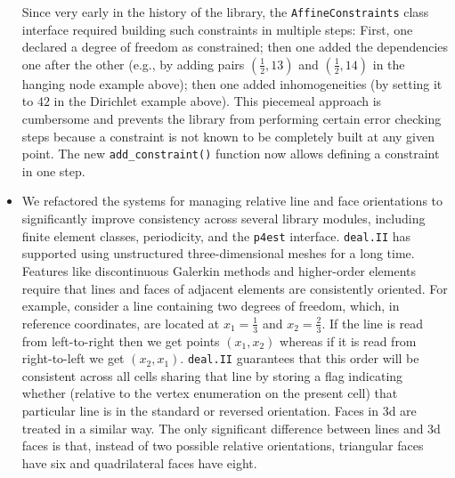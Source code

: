 \documentclass{ansarticle-preprint}
\newcommand{\specialword}[1]{\texttt{#1}}
\newcommand{\dealii}{{\specialword{deal.II}}\xspace}
\newcommand{\pfrst}{{\specialword{p4est}}\xspace}
\begin{document}
\begin{itemize}
    Since very early in the history of the library, the
    \texttt{AffineConstraints} class interface required building such
    constraints in multiple steps: First, one declared a degree of
    freedom as constrained; then one added the dependencies one after
    the other (e.g., by adding pairs $(\frac 12, 13)$ and $(\frac 12,
    14)$ in the hanging node example above); then one added
    inhomogeneities (by setting it to $42$ in the Dirichlet example
    above). This piecemeal approach is cumbersome and prevents the
    library from performing certain error checking steps because a
    constraint is not known to be completely built at any given point. The new
    \texttt{add\_constraint()} function now allows defining a
    constraint in one step.
  \item We refactored the systems for managing relative line and face
    orientations to significantly improve consistency across several library
    modules, including finite element classes, periodicity, and the
    \pfrst{} interface. \dealii{} has supported using unstructured
    three-dimensional meshes for a long time. Features like discontinuous
    Galerkin methods and higher-order elements require that lines and faces of
    adjacent elements are consistently oriented. For example, consider a line
    containing two degrees of freedom, which, in reference coordinates, are
    located at $x_1 = \frac 1 3$ and $x_2 = \frac 2 3$. If the line is read from
    left-to-right then we get points $(x_1, x_2)$ whereas if it is read from
    right-to-left we get $(x_2, x_1)$. \dealii{} guarantees that this order will
    be consistent across all cells sharing that line by storing a flag
    indicating whether (relative to the vertex enumeration on the present cell)
    that particular line is in the standard or reversed orientation. Faces in 3d
    are treated in a similar way. The only significant difference between lines
    and 3d faces is that, instead of two possible relative orientations,
    triangular faces have six and quadrilateral faces have eight.


\end{itemize}
\end{document}
